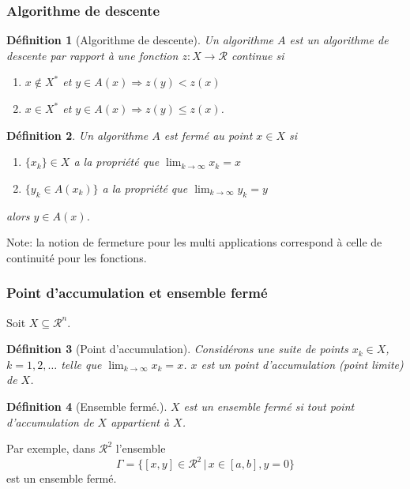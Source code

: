 \documentclass[usepdftitle=false]{beamer}
\newtheorem{defn}{Définition}
\def\cR{\mathcal{R}}
\begin{document}
\begin{frame}
\frametitle{Algorithme de descente}

\begin{defn}[Algorithme de descente]
Un algorithme $A$ est un algorithme de descente par rapport à une fonction $z: X \rightarrow \cR$ continue si
\begin{enumerate}
\item
$x \notin X^*$ et $y \in A(x) \Rightarrow z (y) < z(x)$
\item
$x \in X^*$ et $y \in A(x) \Rightarrow z(y) \leq z(x)$.
\end{enumerate}
\end{defn}

\begin{defn}
Un algorithme $A$ est fermé au point $x \in X$ si
\begin{enumerate}
\item
$\{ x_k \} \in X$ a la propriété que $\lim_{k \rightarrow \infty} x_k = x$
\item
$\{ y_k \in A(x_k) \}$ a la propriété que $\lim_{k \rightarrow \infty} y_k = y$
\end{enumerate}
alors $y \in A(x)$.
\end{defn}

Note: la notion de fermeture pour les multi applications correspond à celle de continuité pour les fonctions.

\end{frame}

\begin{frame}
\frametitle{Point d'accumulation et ensemble fermé}

Soit $X \subseteq \cR^n$.

\begin{defn}[Point d'accumulation]
Considérons une suite de points $x_k \in X$, $k = 1, 2,\ldots$ telle que $\lim_{k \rightarrow \infty} x_k = x$. $x$ est un point d'accumulation (point limite) de $X$.
\end{defn}

\begin{defn}[Ensemble fermé.]
$X$ est un ensemble fermé si tout point d'accumulation de $X$ appartient à $X$.
\end{defn}

\mbox{}

Par exemple, dans $\cR^2$ l'ensemble
$$
\Gamma = \{ [ x, y ] \in \cR^2 \,|\, x \in [ a, b ], y = 0 \}
$$
est un ensemble fermé.

\end{frame}
\end{document}
